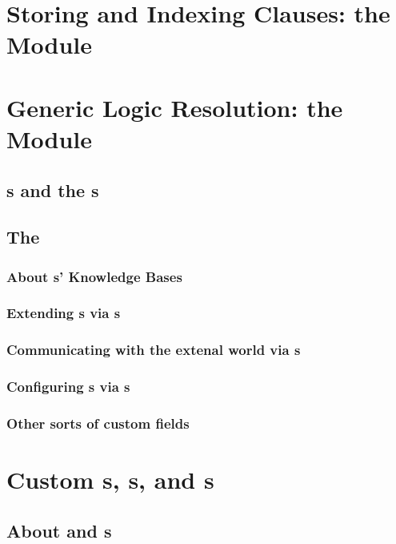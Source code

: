 \documentclass[presentation]{beamer}
\begin{document}
\section{Storing and Indexing Clauses: the  Module}

\section{Generic Logic Resolution: the  Module}

\subsection{s and the s}

\subsection{The }

\subsubsection{About s' Knowledge Bases}

\subsubsection{Extending s via s}

\subsubsection{Communicating with the extenal world via s}

\subsubsection{Configuring s via s}

\subsubsection{Other sorts of custom fields}

\section{Custom s, s, and s}

\subsection{About  and s}
\end{document}
